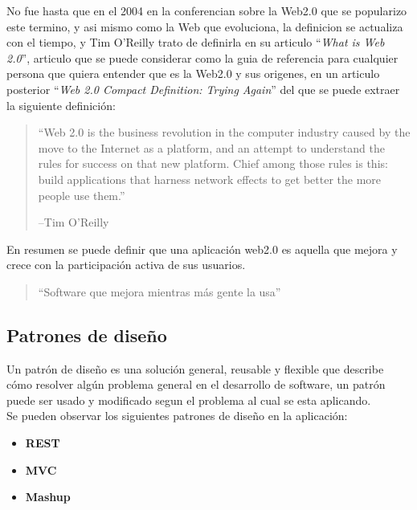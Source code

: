     No fue hasta que en  el 2004 en la conferencian sobre la Web2.0 que se popularizo este termino, 
    y asi mismo como la Web que evoluciona, la definicion se actualiza con el tiempo, 
    y Tim O’Reilly trato de definirla en su articulo ``\emph{What is Web 2.0}''\cite{web5},
    articulo que se puede considerar como la guia de referencia para cualquier persona que quiera
    entender que es la Web2.0 y sus origenes,
    en un articulo posterior ``\emph{Web 2.0 Compact Definition: Trying Again}''\cite{web9}
    del que se puede extraer la siguiente definici\'on:\\
    \begin{quote}
      “Web 2.0 is the business revolution in the computer industry caused by the move to the
       Internet as a platform, and an attempt to understand the rules for success on that new
       platform. Chief among those rules is this: build applications that harness network
       effects to get better the more people use them.”
       \begin{flushright}
       --Tim O’Reilly
       \end{flushright}
    \end{quote}
    En resumen se puede definir que una aplicación web2.0 es aquella que mejora y crece con la 
    participación activa de sus usuarios.

    \begin{quote}
      “Software que mejora mientras más gente la usa” \cite{web5}
    \end{quote}

    \subsection{Patrones de dise\~no} %
    \label{sub:patrones_de_diseno}
    

    Un patrón de diseño es una solución general, reusable  y flexible 
    que describe cómo resolver algún problema general en el desarrollo 
    de software, un patrón puede ser usado y modificado segun el problema 
    al cual se esta aplicando.\\

    Se pueden observar los siguientes patrones de dise\~no en la aplicación:
    \begin{itemize}
      \item \textbf{REST}
      \item \textbf{MVC}
      \item \textbf{Mashup}
    \end{itemize}

